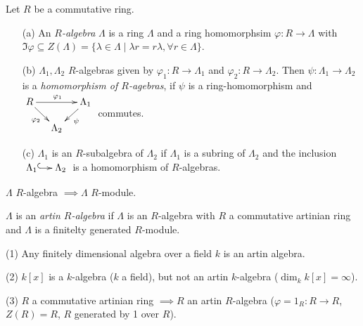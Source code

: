 Let $R$ be a commutative ring.
\begin{defin}
\begin{enumerate}
\item[(a)] An \emph{$R$-algebra} $\Lambda$ is a ring $\Lambda$ and a
  ring homomorphsim $\varphi\colon  R \to \Lambda$ with $\Im \varphi
  \subseteq Z(\Lambda) = \{ \lambda \in \Lambda \mid \lambda
  r=r\lambda, \forall r \in \Lambda \}$. 

\item[(b)] $\Lambda_1, \Lambda_2$ $R$-algebras given by $\varphi_1
  \colon  R \to \Lambda_1$ and $\varphi_2 \colon  R \to
  \Lambda_2$. Then $\psi \colon   \Lambda_1 \to \Lambda_2$ is a
  \emph{homomorphism of $R$-agebras}, if $\psi$ is a ring-homomorphism and
  $\vcenter{\xymatrix@R-1pc@C-1pc{ 
R \ar[rr]^{\varphi_1} \ar[dr]_{\varphi_2} && \Lambda_1 \ar[dl]^{\psi}\\
&\Lambda_2&
}}$ commutes.

\item[(c)] $\Lambda_1$ is an $R$-subalgebra of $\Lambda_2$ if
  $\Lambda_1$ is a subring of $\Lambda_2$ and the inclusion
  $\xymatrix@C-1pc{\Lambda_1 \ar@{^{(}->}[r] & \Lambda_2}$ is a
  homomorphism of $R$-algebras. 
\end{enumerate}
\end{defin}

\begin{note}
$\Lambda$ $R$-algebra $\implies \Lambda$ $R$-module.
\end{note}

\begin{defin}
$\Lambda$ is an \emph{artin $R$-algebra} if $\Lambda$ is an
$R$-algebra with $R$ a commutative artinian ring and $\Lambda$ is a
finitelty generated $R$-module. 
\end{defin}

\begin{exam}
(1) Any finitely dimensional algebra over a field $k$ is an artin algebra.

(2) $k[x]$ is a $k$-algebra ($k$ a field), but not an artin
$k$-algebra ($\dim_k k[x] = \infty$).

(3) $R$ a commutative artinian ring $\implies R$ an artin $R$-algebra
($\varphi = 1_R \colon R \to R$, $Z(R) = R$, $R$ generated by 1 over
$R$).
\end{exam}

